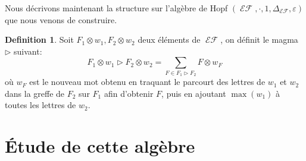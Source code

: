 \documentclass[french]{article}
\theoremstyle{definition}
\newtheorem{defi}{Definition}[section]
\theoremstyle{plain}
\newcommand{\e}{\varepsilon}
\newcommand{\K}{\mathbb{K}}
\DeclareMathOperator{\EF}{\mathcal{EF}}
\DeclareMathOperator{\FTBD}{\mathcal{FTBD}}
\DeclareMathOperator{\TTBD}{\mathcal{TTBD}}
\begin{document}
Nous décrivons maintenant la structure \PH{} sur l'algèbre de Hopf $(\EF,\cdot, 1, \Delta_{\EF},\e)$ que nous venons de construire.

\begin{defi}
	Soit $F_1\otimes w_1, F_2\otimes w_2$ deux éléments de $\EF$, on définit le magma $\rhd$ suivant:
	\[
	F_1\otimes w_1 \rhd F_2\otimes w_2 = \sum_{F\in F_1\rhd F_2} F \otimes w_F
	\] où $w_F$ est le nouveau mot obtenu en traquant le parcourt des lettres de $w_1$ et $w_2$ dans la greffe de $F_2$ sur $F_1$ afin d'obtenir $F$, puis en ajoutant $\max(w_1)$ à toutes les lettres de $w_2$.
\end{defi}



\section{\'Etude de cette algèbre \PH{}}
% 
% 
\end{document}
